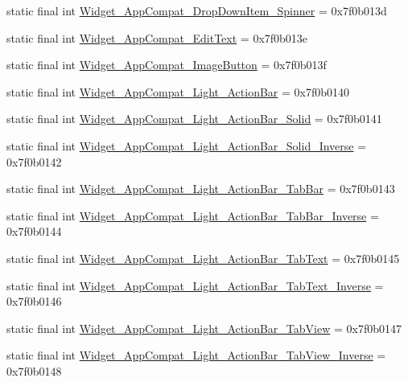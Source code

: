 \begin{CompactItemize}
\item 
static final int \hyperlink{classandroid_1_1support_1_1transition_1_1_r_1_1style_822c87247d330f97f107b862d2839cef}{Widget\_\-AppCompat\_\-DropDownItem\_\-Spinner} = 0x7f0b013d
\item 
static final int \hyperlink{classandroid_1_1support_1_1transition_1_1_r_1_1style_ddb3abe3646b0ae06cdad86ef2d879fc}{Widget\_\-AppCompat\_\-EditText} = 0x7f0b013e
\item 
static final int \hyperlink{classandroid_1_1support_1_1transition_1_1_r_1_1style_0373fe4d46cb5f906571fb23ae598fca}{Widget\_\-AppCompat\_\-ImageButton} = 0x7f0b013f
\item 
static final int \hyperlink{classandroid_1_1support_1_1transition_1_1_r_1_1style_79b374784a1b692a407247991732ddc6}{Widget\_\-AppCompat\_\-Light\_\-ActionBar} = 0x7f0b0140
\item 
static final int \hyperlink{classandroid_1_1support_1_1transition_1_1_r_1_1style_12f0d1264d7167fbd6b0167e78baad75}{Widget\_\-AppCompat\_\-Light\_\-ActionBar\_\-Solid} = 0x7f0b0141
\item 
static final int \hyperlink{classandroid_1_1support_1_1transition_1_1_r_1_1style_ef91a13b55d72dc9f89a4f18c51a1114}{Widget\_\-AppCompat\_\-Light\_\-ActionBar\_\-Solid\_\-Inverse} = 0x7f0b0142
\item 
static final int \hyperlink{classandroid_1_1support_1_1transition_1_1_r_1_1style_4175e959fbb8558f404a8fb37fe81811}{Widget\_\-AppCompat\_\-Light\_\-ActionBar\_\-TabBar} = 0x7f0b0143
\item 
static final int \hyperlink{classandroid_1_1support_1_1transition_1_1_r_1_1style_aad8bc0e940952a983334b1a832458b5}{Widget\_\-AppCompat\_\-Light\_\-ActionBar\_\-TabBar\_\-Inverse} = 0x7f0b0144
\item 
static final int \hyperlink{classandroid_1_1support_1_1transition_1_1_r_1_1style_69794afb046ddd2bfef17195e3b40f39}{Widget\_\-AppCompat\_\-Light\_\-ActionBar\_\-TabText} = 0x7f0b0145
\item 
static final int \hyperlink{classandroid_1_1support_1_1transition_1_1_r_1_1style_0cb6bde4740c172dc2d80746bb2a7453}{Widget\_\-AppCompat\_\-Light\_\-ActionBar\_\-TabText\_\-Inverse} = 0x7f0b0146
\item 
static final int \hyperlink{classandroid_1_1support_1_1transition_1_1_r_1_1style_f78e0eb1054ab763da81294a295c1134}{Widget\_\-AppCompat\_\-Light\_\-ActionBar\_\-TabView} = 0x7f0b0147
\item 
static final int \hyperlink{classandroid_1_1support_1_1transition_1_1_r_1_1style_64bdfd9e5e84434c0ee42f61eb65e542}{Widget\_\-AppCompat\_\-Light\_\-ActionBar\_\-TabView\_\-Inverse} = 0x7f0b0148

\end{CompactItemize}
